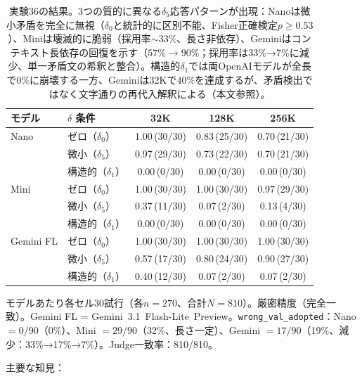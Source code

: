 \documentclass[11pt,a4paper]{article}
\begin{document}
\begin{table}[h]
\centering
\small
\begin{tabular}{llccc}
\toprule
\textbf{モデル} & \textbf{$\delta$ 条件} & \textbf{32K} & \textbf{128K} & \textbf{256K} \\
\midrule
Nano & ゼロ（$\delta_0$）   & 1.00\,(30/30) & 0.83\,(25/30) & 0.70\,(21/30) \\
     & 微小（$\delta_5$）   & 0.97\,(29/30) & 0.73\,(22/30) & 0.70\,(21/30) \\
     & 構造的（$\delta_1$） & 0.00\,(0/30)  & 0.00\,(0/30)  & 0.00\,(0/30)  \\
\midrule
Mini & ゼロ（$\delta_0$）   & 1.00\,(30/30) & 1.00\,(30/30) & 0.97\,(29/30) \\
     & 微小（$\delta_5$）   & 0.37\,(11/30) & 0.07\,(2/30)  & 0.13\,(4/30)  \\
     & 構造的（$\delta_1$） & 0.00\,(0/30)  & 0.00\,(0/30)  & 0.00\,(0/30)  \\
\midrule
Gemini FL & ゼロ（$\delta_0$）   & 1.00\,(30/30) & 1.00\,(30/30) & 1.00\,(30/30) \\
          & 微小（$\delta_5$）   & 0.57\,(17/30) & 0.80\,(24/30) & 0.90\,(27/30) \\
          & 構造的（$\delta_1$） & 0.40\,(12/30) & 0.07\,(2/30)  & 0.07\,(2/30)  \\
\bottomrule
\end{tabular}

\vspace{2pt}
{\footnotesize モデルあたり各セル30試行（各$n = 270$、合計$N = 810$）。厳密精度（完全一致）。Gemini FL = Gemini~3.1~Flash-Lite~Preview。\texttt{wrong\_val\_adopted}：Nano $= 0/90$（0\%）、Mini $= 29/90$（32\%、長さ一定）、Gemini $= 17/90$（19\%、減少：33\%→17\%→7\%）。Judge一致率：810/810。}
\caption{実験36の結果。3つの質的に異なる$\delta_5$応答パターンが出現：Nanoは微小矛盾を完全に無視（$\delta_0$と統計的に区別不能、Fisher正確検定$p \geq 0.53$）、Miniは壊滅的に脆弱（採用率$\sim$33\%、長さ非依存）、Geminiはコンテキスト長依存の回復を示す（$57\% \to 90\%$；採用率は33\%→7\%に減少、単一矛盾文の希釈と整合）。構造的$\delta_1$では両OpenAIモデルが全長で$0\%$に崩壊する一方、Geminiは32Kで$40\%$を達成するが、矛盾検出ではなく文字通りの再代入解釈による（本文参照）。}
\label{tab:exp36}
\end{table}

\noindent 主要な知見：
\end{document}
